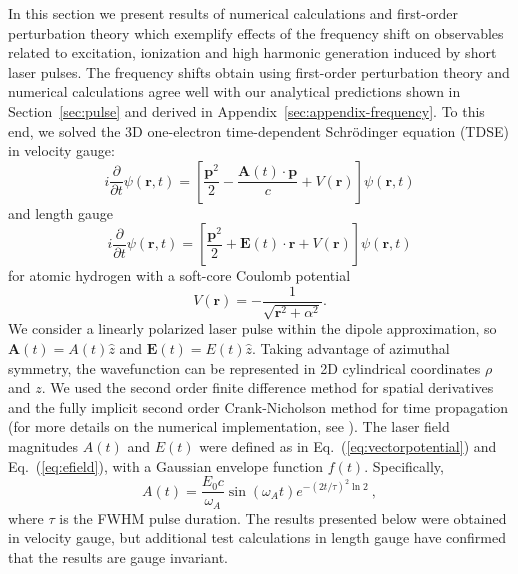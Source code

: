 In this section we present results of numerical calculations and first-order perturbation theory which exemplify effects of the frequency shift on observables related to excitation, ionization and high harmonic generation induced by short laser pulses. The frequency shifts obtain using first-order perturbation theory and numerical calculations agree well with our analytical predictions shown in Section~\ref{sec:pulse} and derived in Appendix~\ref{sec:appendix-frequency}. To this end, we solved the 3D one-electron time-dependent Schr\"odinger equation (TDSE) in velocity gauge:
\begin{equation}
i\frac{\partial}{\partial t}\psi(\mathbf{r},t) = \left[\frac{\mathbf{p}^2}{2} - \frac{\mathbf{A}(t) \cdot \mathbf{p}}{c} + V(\mathbf{r})\right]\psi(\mathbf{r},t)
\end{equation}
and length gauge
\begin{equation}
i\frac{\partial}{\partial t}\psi(\mathbf{r},t) = \left[\frac{\mathbf{p}^2}{2} + \mathbf{E}(t) \cdot \mathbf{\mathbf{r}} + V(\mathbf{r})\right]\psi(\mathbf{r},t)
\end{equation}
for atomic hydrogen with a soft-core Coulomb potential
\begin{equation}
V(\mathbf{r}) = -\frac{1}{\sqrt{\mathbf{r}^2+\alpha ^2}}.
\end{equation}
We consider a linearly polarized laser pulse within the dipole approximation, so $\mathbf{A}(t)=A(t)\hat{z}$ and $\mathbf{E}(t)=E(t)\hat{z}$. Taking advantage of azimuthal symmetry, the wavefunction can be represented in 2D cylindrical coordinates $\rho$ and $z$. We used the second order finite difference method for spatial derivatives and the fully implicit second order Crank-Nicholson method for time propagation (for more details on the numerical implementation, see \cite{venzke-submitted}). The laser field magnitudes $A(t)$ and $E(t)$ were defined as in Eq.~(\ref{eq:vectorpotential}) and Eq.~(\ref{eq:efield}), with a Gaussian envelope function $f(t)$.
Specifically,
\begin{equation}
\label{eq:numericalVecPot}
A(t) = \frac{E_0c}{\omega_A}\sin(\omega_A t)e^{-(2t/\tau)^2\ln 2} ~,
\end{equation}
where $\tau$ is the FWHM pulse duration. The results presented below were obtained in velocity gauge, but additional test calculations in length gauge have confirmed that the results are gauge invariant.

